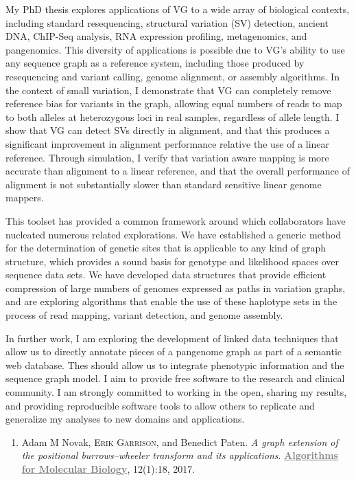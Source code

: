 \documentclass{nihbiosketch}
\newcommand{\hijournal}[1]{{\bf \textcolor{gray}{\uline{#1}}}}
\begin{document}
\begin{enumerate}
My PhD thesis explores applications of VG to a wide array of biological contexts, including standard resequencing, structural variation (SV) detection, ancient DNA, ChIP-Seq analysis, RNA expression profiling, metagenomics, and pangenomics. This diversity of applications is possible due to VG’s ability to use any sequence graph as a reference system, including those produced by resequencing and variant calling, genome alignment, or assembly algorithms. In the context of small variation, I demonstrate that VG can completely remove reference bias for variants in the graph, allowing equal numbers of reads to map to both alleles at heterozygous loci in real samples, regardless of allele length. I show that VG can detect SVs directly in alignment, and that this produces a significant improvement in alignment performance relative the use of a linear reference. Through simulation, I verify that variation aware mapping is more accurate than alignment to a linear reference, and that the overall performance of alignment is not substantially slower than standard sensitive linear genome mappers.

This toolset has provided a common framework around which collaborators have nucleated numerous related explorations. We have established a generic method for the determination of genetic sites that is applicable to any kind of graph structure, which provides a sound basis for genotype and likelihood spaces over sequence data sets. We have developed data structures that provide efficient compression of large numbers of genomes expressed as paths in variation graphs, and are exploring algorithms that enable the use of these haplotype sets in the process of read mapping, variant detection, and genome assembly.

In further work, I am exploring the development of linked data techniques that allow us to directly annotate pieces of a pangenome graph as part of a semantic web database. Thes should allow us to integrate phenotypic information and the sequence graph model. I aim to provide free software to the research and clinical community. I am strongly committed to working in the open, sharing my results, and providing reproducible software tools to allow others to replicate and generalize my analyses to new domains and applications.

  \begin{enumerate} %

  \item Adam M Novak, \textsc{Erik Garrison}, and Benedict Paten. \emph{A graph extension of the positional burrows–wheeler transform and its applications}. \hijournal{Algorithms for Molecular Biology}, 12(1):18, 2017.


\end{enumerate}
\end{enumerate}
\end{document}
